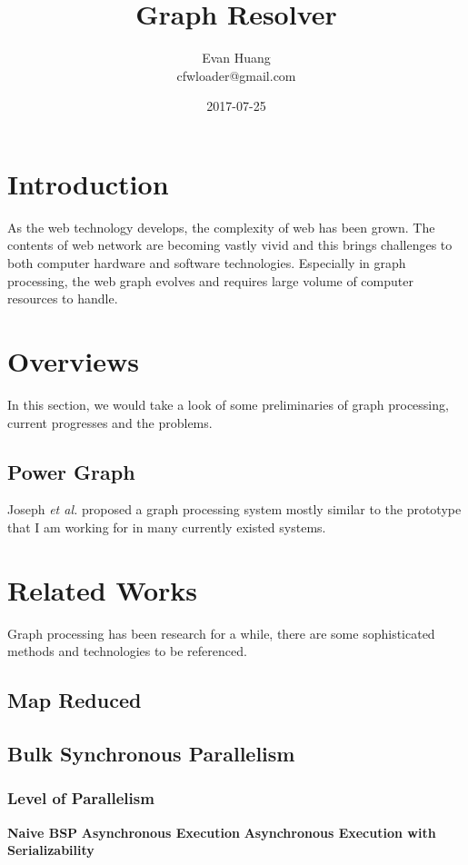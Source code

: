 \documentclass{article}
\title{Graph Resolver}
\date{2017-07-25}
\author{Evan Huang \\ cfwloader@gmail.com}
\begin{document}
	\maketitle

	\tableofcontents


	\newpage

	\section{Introduction}
	As the web technology develops, the complexity of web has been grown. The contents of web network are becoming vastly vivid and this brings challenges to both computer hardware and software technologies. Especially in graph processing, the web graph evolves and requires large volume of computer resources to handle.

	\section{Overviews}
	In this section, we would take a look of some preliminaries of graph processing, current progresses and the problems.
	\subsection{Power Graph}
	Joseph \emph{et al.}\cite{gonzalez2012powergraph:} proposed a graph processing system mostly similar to the prototype that I am working for in many currently existed systems.

	\section{Related Works}
	Graph processing has been research for a while, there are some sophisticated methods and technologies to be referenced. 
	\subsection{Map Reduced}
	\subsection{Bulk Synchronous Parallelism}
	\subsubsection{Level of Parallelism}
	\textbf{Naive BSP}
	\newline
	\textbf{Asynchronous Execution}
	\newline
	\textbf{Asynchronous Execution with Serializability}
\end{document}
